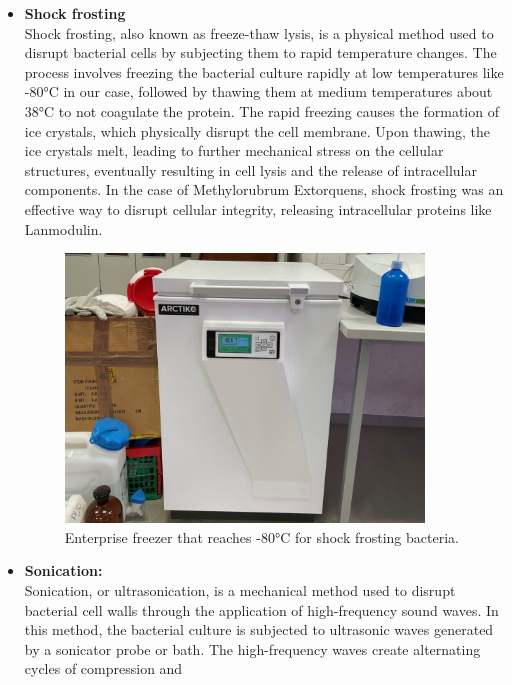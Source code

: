 \begin{itemize}
    \item \textbf{Shock frosting} \\
    Shock frosting, also known as freeze-thaw lysis, is a physical method used to disrupt
    bacterial cells by subjecting them to rapid temperature changes. The process involves
    freezing the bacterial culture rapidly at low temperatures like -80°C in our case,
    followed by thawing them at medium temperatures about 38°C to not coagulate the
    protein. The rapid freezing causes the formation of ice crystals, which physically
    disrupt the cell membrane. Upon thawing, the ice crystals melt, leading to further
    mechanical stress on the cellular structures, eventually resulting in cell lysis and the
    release of intracellular components.
    In the case of Methylorubrum Extorquens, shock frosting was an effective way to
    disrupt cellular integrity, releasing intracellular proteins like Lanmodulin.
    \begin{figure}[H]
        \centering
        \includegraphics[width=0.9\textwidth]{./media/images/enterprise_freezer}
        \caption{Enterprise freezer that reaches -80°C for shock frosting bacteria.}
        \label{fig:enterprise_freezer}
    \end{figure}
    \item \textbf{Sonication:} \\
    Sonication, or ultrasonication, is a mechanical method used to disrupt bacterial cell
    walls through the application of high-frequency sound waves. In this method, the
    bacterial culture is subjected to ultrasonic waves generated by a sonicator probe or
    bath. The high-frequency waves create alternating cycles of compression and

\end{itemize}
